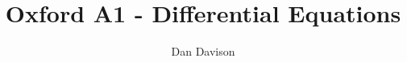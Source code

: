 \documentclass[12pt]{article}
\begin{document}
\title{Oxford A1 - Differential Equations }
\author{Dan Davison}
\maketitle
\end{document}
